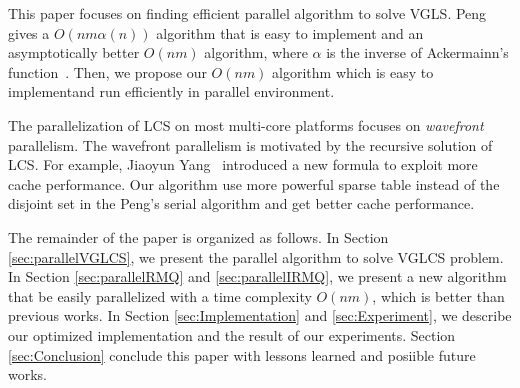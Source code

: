 This paper focuses on finding efficient parallel algorithm to solve
VGLS.  Peng~\cite{Peng2011TheLC} gives a $O(nm \alpha(n))$ algorithm
that is easy to implement and an asymptotically better $O(nm)$
algorithm, where $\alpha$ is the inverse of Ackermainn's
function~\cite{Banachowski1980ACT}. Then, we propose our $O(nm)$
algorithm which is easy to implementand run efficiently in parallel
environment.


The parallelization of LCS on most multi-core platforms focuses on
{\em wavefront} parallelism.  The wavefront parallelism is motivated
by the recursive solution of LCS.  For example, Jiaoyun
Yang~\cite{Yang2010AnEP} introduced a new formula to exploit more
cache performance.  Our algorithm use more powerful sparse table
instead of the disjoint set in the Peng's serial algorithm and get
better cache performance.


\iffalse 在約束條件下的 LCS 中，如 \emph{fixed gap LCS } (FGLCS)要求任
兩個挑選的距離在相對應的另一個字串中相等，同時距離最大為 $k+1$，可在時
間複雜度在 $O(nm)$ 內解決，其中 $n$, $m$ 分別為兩個輸入的字串長度。我
們將在這篇論文針對 \emph{variable gap LCS} (VGLCS) 進行探討。在 VGLCS
中，對各個不同的位置提供約束限制，如目前給定兩個字串 $A =
\tt{GCGCAATG}$, $B = \tt{GCCCTAGCG}$，各自的約束限制為 $G_A = [3, 1,
  1, 2, 0, 0, 2, 1]$ 和 $G_B = [2, 0, 3, 2, 0, 1, 2, 0, 1]$，其中
$G_A(i)$ 表示當挑選第 $i$ 個位置時，與前一個挑選的位置最多差
$G_A(i)+1$，同理 $G_B(i)$；我們可以得到兩組 VGLCS 的解
$\tt{G..C..C..A}$ 和 $\tt{G..C..C..T}$，挑選的方式如圖
~\ref{fig:VGLCSex}。在 Yung-Hsing Peng ~\cite{yunghsing} 的論文已對
VGLCS 提出易於實作的 $O(nm \alpha(n))$ 和理論 $O(nm)$ 的解法。\fi


The remainder of the paper is organized as follows.  In Section
\ref{sec:parallelVGLCS}, we present the parallel algorithm to solve
VGLCS problem.  In Section \ref{sec:parallelRMQ} and
\ref{sec:parallelIRMQ}, we present a new algorithm that be easily
parallelized with a time complexity $O(nm)$, which is better than
previous works.  In Section \ref{sec:Implementation} and
\ref{sec:Experiment}, we describe our optimized implementation and the
result of our experiments. Section \ref{sec:Conclusion} conclude this
paper with lessons learned and posiible future works.

\iffalse 這一篇論文，我們將在第二 \ref{sec:parallelVGLCS} 節部分將
Yung-Hsing Peng ~\cite{yunghsing} 提出的算法進行平行化。在第三節
~\ref{sec:parallelRMQ}，在理論分析上提供易平行且時間複雜度 $O(nm)$ 的
設計。在第四節 ~\ref{sec:Implementation}，我們將藉由快取忘卻
(cache-oblivious) 技術，在實作上提供更好的效能。最後，我們總結實驗結果
與理論實務上的差異。\fi

